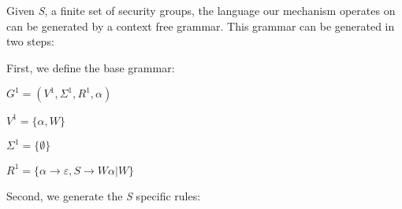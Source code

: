 \documentclass{article}
\begin{document}
Given \emph{S}, a finite set of security groups, the language our mechanism operates on can be generated by a context free grammar. This grammar can be generated in two steps:

First, we define the base grammar:

$G^1 = (V^1, \Sigma^1, R^1, \alpha)$

$V^1 = \{\alpha , W\}$

$\Sigma ^1 = \{ \emptyset\}$

$R^1 = \{ \alpha \rightarrow \varepsilon , S\rightarrow W\alpha |W\}$

Second, we generate the \emph{S} specific rules:
\end{document}
